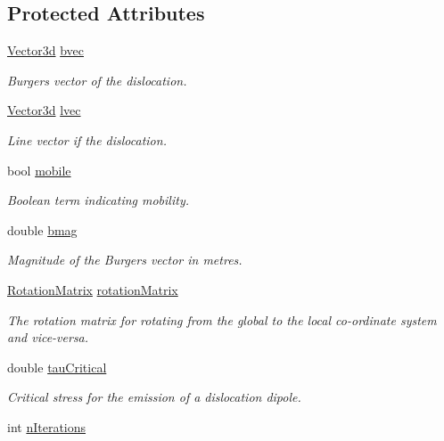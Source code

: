 \subsection*{Protected Attributes}
\begin{DoxyCompactItemize}
\item 
\hyperlink{classVector3d}{Vector3d} \hyperlink{classDislocationSource_ade4753ac6106317c693c2bba4f83a568}{bvec}
\begin{DoxyCompactList}\small\item\em Burgers vector of the dislocation. \end{DoxyCompactList}\item 
\hyperlink{classVector3d}{Vector3d} \hyperlink{classDislocationSource_a6a1ab6dc549236d2335a200e601781ea}{lvec}
\begin{DoxyCompactList}\small\item\em Line vector if the dislocation. \end{DoxyCompactList}\item 
bool \hyperlink{classDislocationSource_a7cfb4fd64ac4da8c79398b6e2c732875}{mobile}
\begin{DoxyCompactList}\small\item\em Boolean term indicating mobility. \end{DoxyCompactList}\item 
double \hyperlink{classDislocationSource_a59c95f3cb5af5180d2c42792413f7816}{bmag}
\begin{DoxyCompactList}\small\item\em Magnitude of the Burgers vector in metres. \end{DoxyCompactList}\item 
\hyperlink{classRotationMatrix}{Rotation\-Matrix} \hyperlink{classDislocationSource_a3bb826a0646d5c5546045cbf8d523b4f}{rotation\-Matrix}
\begin{DoxyCompactList}\small\item\em The rotation matrix for rotating from the global to the local co-\/ordinate system and vice-\/versa. \end{DoxyCompactList}\item 
double \hyperlink{classDislocationSource_ad91294a3ab5b6f6156a2ad67b9df954e}{tau\-Critical}
\begin{DoxyCompactList}\small\item\em Critical stress for the emission of a dislocation dipole. \end{DoxyCompactList}\item 
int \hyperlink{classDislocationSource_aacf42c7505f28b50280b23b435024e17}{n\-Iterations}

\end{DoxyCompactItemize}
